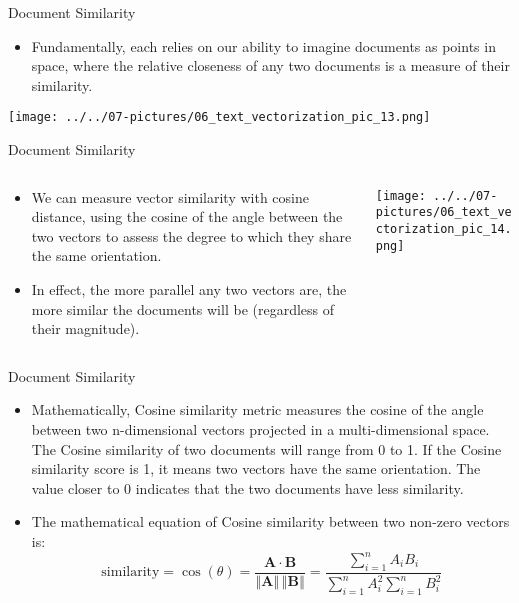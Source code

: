 \documentclass[11pt]{beamer}
\begin{document}
\begin{frame}{Document Similarity}
	\begin{itemize}
		\item Fundamentally, each relies on our ability to imagine documents as points in space, where the relative closeness of any two documents is a measure of their similarity.
	\end{itemize}
	\begin{center}
	\texttt{[image: ../../07-pictures/06\_text\_vectorization\_pic\_13.png]}
	\end{center}
\end{frame}
\begin{frame}{Document Similarity}
\begin{columns}[T] %
\begin{column}{.48\textwidth}
        \begin{itemize}
		\item We can measure vector similarity with cosine distance, using the cosine of the angle between the two vectors to assess the degree to which they share the same orientation. 
		\item In effect, the more parallel any two vectors are, the more similar the documents will be (regardless of their magnitude).
        \end{itemize}
\end{column}%
\hfill%
\begin{column}{.48\textwidth}
        \texttt{[image: ../../07-pictures/06\_text\_vectorization\_pic\_14.png]}
\end{column}%
\end{columns}
\end{frame}
\begin{frame}{Document Similarity}
	\begin{itemize}
		\item Mathematically, Cosine similarity metric measures the cosine of the angle between two n-dimensional vectors projected in a multi-dimensional space. The Cosine similarity of two documents will range from 0 to 1. If the Cosine similarity score is 1, it means two vectors have the same orientation. The value closer to 0 indicates that the two documents have less similarity.
		\item The mathematical equation of Cosine similarity between two non-zero vectors is: \begin{equation} \text{similarity} = \cos(\theta) = \frac{\mathbf{A} \cdot \mathbf{B}}{\left\Vert\mathbf{A}\right\Vert \,\left\Vert\mathbf{B}\right\Vert} = \frac{\sum\limits_{i=1}^n A_iB_i}{\sum\limits_{i=1}^n A_i^2 \sum\limits_{i=1}^n B_i^2} \end{equation}
	\end{itemize}
\end{frame}
\end{document}
